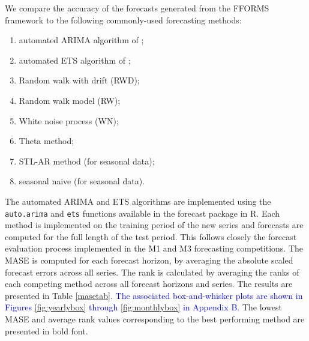 \documentclass[11pt,a4paper,]{article}
\providecommand{\tightlist}{%
  \setlength{\itemsep}{0pt}\setlength{\parskip}{0pt}}
\begin{document}
We compare the accuracy of the forecasts generated from the FFORMS framework to the following commonly-used forecasting methods:

\begin{enumerate}
\def\labelenumi{\arabic{enumi}.}
\tightlist
\item
  automated ARIMA algorithm of \textcite{Hyndman2008};
\item
  automated ETS algorithm of \textcite{Hyndman2008};
\item
  Random walk with drift (RWD);
\item
  Random walk model (RW);
\item
  White noise process (WN);
\item
  Theta method;
\item
  STL-AR method (for seasonal data);
\item
  seasonal naive (for seasonal data).
\end{enumerate}

The automated ARIMA and ETS algorithms are implemented using the \texttt{auto.arima} and \texttt{ets} functions available in the forecast package in R. Each method is implemented on the training period of the new series and forecasts are computed for the full length of the test period. This follows closely the forecast evaluation process implemented in the M1 and M3 forecasting competitions. The MASE is computed for each forecast horizon, by averaging the absolute scaled forecast errors across all series. The rank is calculated by averaging the ranks of each competing method across all forecast horizons and series. The results are presented in Table \ref{masetab}. \textcolor{blue}{The associated box-and-whisker plots are shown in Figures}
\ref{fig:yearlybox} \textcolor{blue}{through} \ref{fig:monthlybox} \textcolor{blue}{in Appendix B.} The lowest MASE and average rank values corresponding to the best performing method are presented in bold font.
\end{document}
